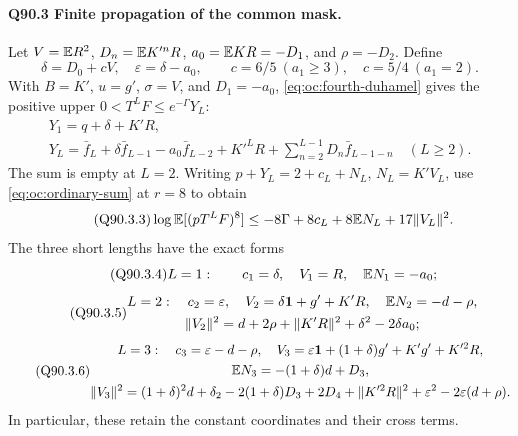 \paragraph{Q90.3 Finite propagation of the common mask.}
Let \(V=\allowbreak \mathbb E R^2\), \(D_n=\allowbreak \mathbb E K'^nR\), \(a_0=\allowbreak \mathbb E KR=\allowbreak -D_1\),
and \(\rho=\allowbreak -D_2\). Define
\begin{equation}\tag{Q90.3.1}\label{eq:Q90:3.1}
\delta=D_0+cV,\quad\varepsilon=\delta-a_0,\qquad
c=6/5\ (a_1\ge3),\quad c=5/4\ (a_1=2).
\end{equation}
With \(B=K'\), \(u=g'\), \(\sigma=V\), and \(D_1=-a_0\),
\eqref{eq:oc:fourth-duhamel} gives the positive upper
\(0<T^LF\le e^{-\Gamma}Y_L\):
\begin{equation}\tag{Q90.3.2}\label{eq:Q90:3.2}
\begin{gathered}
Y_1=q+\delta+K'R,\\
Y_L=\bar f_L+\delta\bar f_{L-1}-a_0\bar f_{L-2}+K'^LR
 +\sum_{n=2}^{L-1}D_n\bar f_{L-1-n}\quad(L\ge2).
\end{gathered}
\end{equation}
The sum is empty at \(L=2\). Writing
\(p+Y_L=2+c_L+N_L\), \(N_L=K'V_L\), use
\eqref{eq:oc:ordinary-sum} at \(r=8\) to obtain
\begin{equation}\tag{Q90.3.3}\label{eq:Q90:3.3}
\log\mathbb E[(pT^LF)^8]\le-8\Gamma+8c_L+8\mathbb E N_L+17\|V_L\|^2.
\end{equation}
The three short lengths have the exact forms
\begin{equation}\tag{Q90.3.4}\label{eq:Q90:3.4}
L=1:\qquad c_1=\delta,\quad V_1=R,\quad\mathbb E N_1=-a_0;
\end{equation}
\begin{equation}\tag{Q90.3.5}\label{eq:Q90:3.5}
\begin{gathered}
L=2:\quad c_2=\varepsilon,\quad
V_2=\delta\mathbf1+g'+K'R,\quad\mathbb E N_2=-d-\rho,\\
\|V_2\|^2=d+2\rho+\|K'R\|^2+\delta^2-2\delta a_0;
\end{gathered}
\end{equation}
\begin{equation}\tag{Q90.3.6}\label{eq:Q90:3.6}
\begin{gathered}
L=3:\quad c_3=\varepsilon-d-\rho,\quad
V_3=\varepsilon\mathbf1+(1+\delta)g'+K'g'+K'^2R,\\
\mathbb E N_3=-(1+\delta)d+D_3,\\
\|V_3\|^2=(1+\delta)^2d+\delta_2-2(1+\delta)D_3+2D_4
 +\|K'^2R\|^2+\varepsilon^2-2\varepsilon(d+\rho).
\end{gathered}
\end{equation}
In particular, these retain the constant coordinates and their cross terms.

